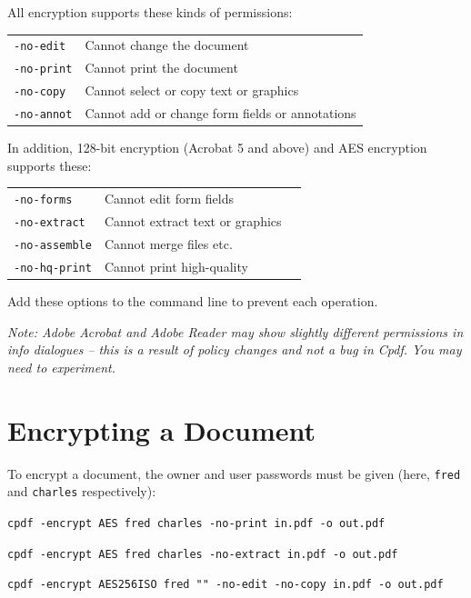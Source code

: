 \documentclass{book}
\begin{document}
   \vspace{2mm}
   \noindent All encryption supports these kinds of permissions:

   \vspace{2mm}
   \begin{tabular}{ll}
     \texttt{-no-edit} & Cannot change the document\\
     \texttt{-no-print} & Cannot print the document\\
     \texttt{-no-copy} & Cannot select or copy text or graphics\\
     \texttt{-no-annot} & Cannot add or change form fields or annotations\\
   \end{tabular}

   \vspace{2mm}
   \noindent In addition, 128-bit encryption (Acrobat 5 and above) and AES encryption supports these:

   \vspace{2mm}
   \begin{tabular}{lll}
     \texttt{-no-forms} & Cannot edit form fields&\\
     \texttt{-no-extract} & Cannot extract text or graphics&\\
     \texttt{-no-assemble} & Cannot merge files etc.&\\
     \texttt{-no-hq-print} & Cannot print high-quality&\\
   \end{tabular}

  \vspace{2mm}
  \noindent Add these options to the command line to prevent each operation.

  \vspace{2mm}
\noindent\textit{Note: Adobe Acrobat and Adobe Reader may show slightly different permissions in info dialogues -- this is a result of policy changes and not a bug in \textup{Cpdf}. You may need to experiment.}

  \vspace{2mm}

  \section{Encrypting a Document}
  To encrypt a document, the owner and user passwords must be given (here, \texttt{fred} and \texttt{charles} respectively):

  \begin{framed}
    \noindent\small\verb!cpdf -encrypt AES fred charles -no-print in.pdf -o out.pdf!

    \vspace{1.5mm}
    \noindent\small\verb!cpdf -encrypt AES fred charles -no-extract in.pdf -o out.pdf!

    \vspace{1.5mm}
    \noindent\small\verb!cpdf -encrypt AES256ISO fred "" -no-edit -no-copy in.pdf -o out.pdf!
  \end{framed}
\end{document}
